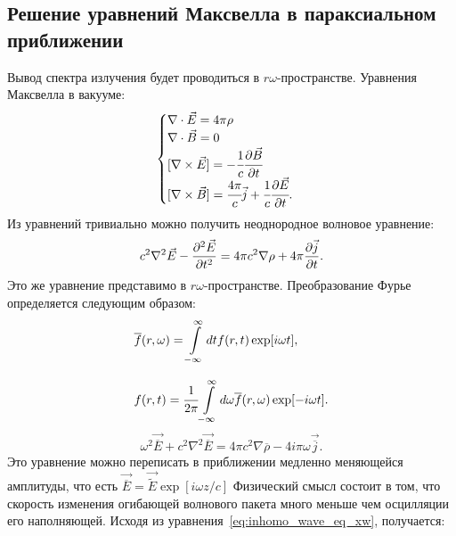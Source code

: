 \subsection{Решение уравнений Максвелла в параксиальном приближении}
Вывод спектра излучения будет проводиться в $r\omega$-пространстве. Уравнения Максвелла в вакууме:
\begin{equation}
	\begin{cases}
		\nabla \cdot \vec{E} = 4\pi \rho\\
		\nabla \cdot \vec{B} = 0\\
		[\nabla \times \vec{E}] = -\cfrac{1}{c} \cfrac{\partial\vec{B}}{\partial t}\\
		[\nabla \times \vec{B}] = \cfrac{4\pi}{c} \vec{j} + \cfrac{1}{c} \cfrac{\partial\vec{E}}{\partial t}.
	\end{cases} 
\end{equation}
Из уравнений тривиально можно получить неоднородное волновое уравнение: 
\begin{equation}
	\label{eq:inhomo_wave_eq_xt}
	c^2 \nabla^2 \vec{E} - \pdv[2]{\vec{E}}{t} = 4\pi c^2 \nabla \rho + 4\pi \pdv{\vec{j}}{t}.
\end{equation}
Это же уравнение представимо в $r\omega$-пространстве. Преобразование Фурье определяется следующим образом:
\begin{equation}
	\label{eq:Fourier_wt}
	\begin{array}{lcl}
		{\overline{f}}(r, \omega) = \displaystyle\int\limits_{-\infty}^{\infty} dt {f}(r, t)\exp[i\omega t],\\
		\\
		{f}(r, t) = \cfrac{1}{2\pi}\displaystyle\int\limits_{-\infty}^{\infty} d\omega {\overline{f}}(r, \omega)\exp[-i\omega t].
	\end{array}
\end{equation}
\begin{equation}
	\label{eq:inhomo_wave_eq_xw}
	\omega^2 \vec{\overline{E}} + c^2 \nabla^2 \vec{\overline{E}} = 4\pi c^2 \nabla  \overline{\rho} - 4i\pi\omega\vec{\overline{j}}.
\end{equation}
Это уравнение можно переписать в приближении медленно меняющейся амплитуды, что есть $\vec{\overline{E}} =  \vec{\widetilde{E}}\exp[i\omega z/c]$
Физический смысл состоит в том, что скорость изменения огибающей волнового пакета много меньше чем осцилляции его наполняющей. Исходя из уравнения~\ref{eq:inhomo_wave_eq_xw}, получается:
